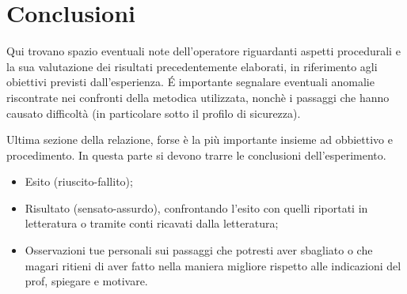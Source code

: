 \section{Conclusioni}
Qui trovano spazio eventuali note dell'operatore riguardanti aspetti procedurali e la sua valutazione dei risultati precedentemente elaborati, in riferimento agli obiettivi previsti dall'esperienza. 
\'E importante segnalare eventuali anomalie riscontrate nei confronti della metodica utilizzata, nonchè i passaggi che hanno causato difficoltà (in particolare sotto il profilo di sicurezza).

Ultima sezione della relazione, forse è la più importante insieme ad obbiettivo e procedimento. In questa parte si devono trarre le conclusioni dell'esperimento. 
\begin{itemize}
    \item Esito (riuscito-fallito);
    \item Risultato (sensato-assurdo), confrontando l'esito con quelli riportati in letteratura o tramite conti ricavati dalla letteratura;
    \item Osservazioni tue personali sui passaggi che potresti aver sbagliato o che magari ritieni di aver fatto nella maniera migliore rispetto alle indicazioni del prof, spiegare e motivare.
\end{itemize}
